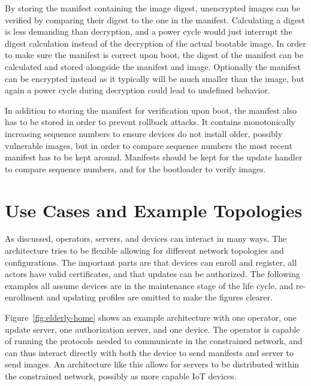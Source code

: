 \documentclass[0-thesis.tex]{subfiles}
\begin{document}
By storing the manifest containing the image digest, unencrypted images can be verified by
comparing their digest to the one in the manifest. Calculating a digest is less demanding
than decryption, and a power cycle would just interrupt the digest calculation instead of
the decryption of the actual bootable image. In order to make sure the manifest is correct
upon boot, the digest of the manifest can be calculated and stored alongside the manifest
and image. Optionally the manifest can be encrypted instead as it typically will be much
smaller than the image, but again a power cycle during decryption could lead to undefined
behavior.

In addition to storing the manifest for verification upon boot, the manifest also has to
be stored in order to prevent rollback attacks. It contains monotonically increasing
sequence numbers to ensure devices do not install older, possibly vulnerable images, but
in order to compare sequence numbers the most recent manifest has to be kept around.
Manifests should be kept for the update handler to compare sequence numbers, and for the
bootloader to verify images.

\section{Use Cases and Example Topologies}
\label{sec:use-cases-examples-topologies}
As discussed, operators, servers, and devices can interact in many ways. The architecture
tries to be flexible allowing for different network topologies and configurations. The
important parts are that devices can enroll and register, all actors have valid
certificates, and that updates can be authorized. The following examples all assume
devices are in the maintenance stage of the life cycle, and re-enrollment and updating
profiles are omitted to make the figures clearer.

Figure~\ref{fig:elderly-home} shows an example architecture with one operator, one
update server, one authorization server, and one device. The operator is capable of
running the protocols needed to communicate in the constrained network, and can thus
interact directly with both the device to send manifests and server to send images. An
architecture like this allows for servers to be distributed within the constrained
network, possibly as more capable IoT devices.
\end{document}
